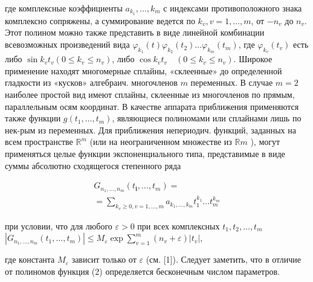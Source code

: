 \documentclass[10pt]{article}
\begin{document}
где комплексные коэффициенты $a_{k_{1}}, \ldots, k_{m}$ с индексами противоположного знака комплексно сопряжены, а суммирование ведется по $k_{v}, v=1, \ldots, m$, от $-n_{v}$ до $n_{v}$. Этот полином можно также представить в виде линейной комбинации всевозможных произведений вида $\varphi_{k_{1}}(t) \varphi_{k_{2}}\left(t_{2}\right) \ldots \varphi_{k_{m}}\left(t_{m}\right)$, где $\varphi_{k_{v}}\left(t_{v}\right)$ есть либо $\sin k_{v} t_{v}\left(0 \leqslant k_{v} \leqslant n_{v}\right)$, либо $\cos k_{v} t_{v} \quad\left(0 \leqslant k_{v} \leqslant n_{v}\right)$. Широкое применение находят многомерные сплайны, «склеенные» до определенной гладкости из «кусков» алгебраич. многочленов $m$ переменных. В случае $m=2$ наиболее простой вид имеют сплайны, склеенные из многочленов по прямым, параллельным осям координат. В качестве аппарата приближения применяются также функции $g\left(t_{1}, \ldots, t_{m}\right)$, являющиеся полиномами или сплайнами лишь по нек-рым из переменных. Для приближения непериодич. функций, заданных на всем пространстве $\mathbb{R}^{m}$ (или на неограниченном множестве из $\mathbb{R} m$ ), могут применяться целые функции экспоненциального типа, представимые в виде суммы абсолютно сходящегося степенного ряда



\[

\begin{gathered}

G_{n_{1}, \ldots, n_{m}}\left(t_{\mathbf{i}}, \ldots, t_{m}\right)= \\

=\sum_{k_{v} \geqslant 0, v=1, \ldots, m} a_{k_{1}, \ldots, k_{m}} t_{1}^{k_{1}} \ldots t_{m}^{k_{m}}

\end{gathered}

\]



при условии, что для любого $\varepsilon>0$ при всех комплексных $t_{1}, t_{2}, \ldots, t_{m}$ $\left|G_{n_{1}, \ldots, n_{m}}\left(t_{1}, \ldots, t_{m}\right)\right| \leqslant M_{\varepsilon} \exp \sum_{v=1}^{m}\left(n_{v}+\varepsilon\right)\left|t_{v}\right|$,



где константа $M_{\varepsilon}$ зависит только от $\varepsilon$ (см. [1]). Следует заметить, что в отличие от полиномов функция (2) определяется бесконечным числом параметров.
\end{document}
